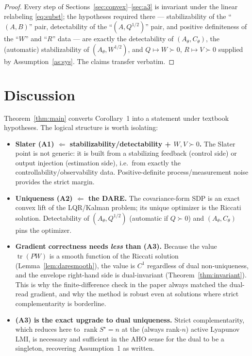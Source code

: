 \documentclass[11pt]{article}
\theoremstyle{definition}
\DeclareMathOperator{\tr}{tr}
\DeclareMathOperator{\rank}{rank}
\newcommand{\Th}{\theta}
\newcommand{\half}{{1/2}}
\begin{document}
\begin{proof}
Every step of Sections~\ref{sec:convex}--\ref{sec:a3} is invariant under the
linear relabeling \eqref{eq:subst}; the hypotheses required there ---
stabilizability of the ``$(A,B)$'' pair, detectability of the ``$(A,Q^{\half})$''
pair, and positive definiteness of the ``$W$'' and ``$R$'' data --- are exactly
the detectability of $(A_\Th,C_\Th)$, the (automatic) stabilizability of
$(A_\Th,W^{\half})$, and $Q\mapsto W\succ0$, $R\mapsto V\succ0$ supplied by
Assumption~\ref{as:sys}. The claims transfer verbatim.
\end{proof}

\section{Discussion}\label{sec:discuss}

Theorem~\ref{thm:main} converts Corollary~1 into a statement under textbook
hypotheses. The logical structure is worth isolating:

\begin{itemize}
\item \textbf{Slater (A1) $\Leftarrow$ stabilizability/detectability + $W,V\succ0$.}
The Slater point is not generic: it is built from a stabilizing feedback (control
side) or output injection (estimation side), i.e.\ from exactly the
controllability/observability data. Positive-definite process/measurement noise
provides the strict margin.
\item \textbf{Uniqueness (A2) $\Leftarrow$ the DARE.} The covariance-form SDP is
an exact convex lift of the LQR/Kalman problem; its unique optimizer is the
Riccati solution. Detectability of $(A_\Th,Q^{\half})$ (automatic if $Q\succ0$)
and $(A_\Th,C_\Th)$ pins the optimizer.
\item \textbf{Gradient correctness needs \emph{less} than (A3).} Because the
value $\tr(PW)$ is a smooth function of the Riccati solution
(Lemma~\ref{lem:daresmooth}), the value is $C^1$ regardless of dual
non-uniqueness, and the envelope right-hand side is dual-invariant
(Theorem~\ref{thm:invariant}). This is why the finite-difference check in the
paper always matched the dual-read gradient, and why the method is robust even at
solutions where strict complementarity is borderline.
\item \textbf{(A3) is the exact upgrade to dual uniqueness.} Strict
complementarity, which reduces here to $\rank S^\star=n$ at the (always rank-$n$)
active Lyapunov LMI, is necessary and sufficient in the AHO sense for the dual to
be a singleton, recovering Assumption~1 as written.
\end{itemize}
\end{document}
